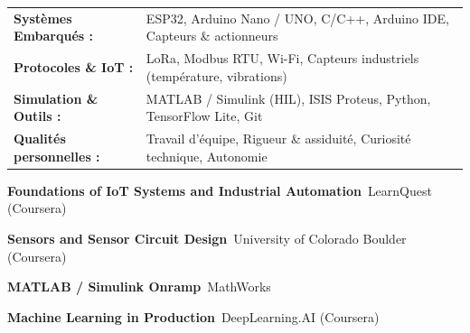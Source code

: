 \documentclass[10pt,a4paper]{../altacv}
\begin{document}
{\small
\begin{tabular}{@{}ll@{}}
\textbf{Systèmes Embarqués :} & ESP32, Arduino Nano / UNO, C/C++, Arduino IDE, Capteurs \& actionneurs \\[1.5pt]
\textbf{Protocoles \& IoT :} & LoRa, Modbus RTU, Wi-Fi, Capteurs industriels (température, vibrations) \\[1.5pt]
\textbf{Simulation \& Outils :} & MATLAB / Simulink (HIL), ISIS Proteus, Python, TensorFlow Lite, Git \\[1.5pt]
\textbf{Qualités personnelles :} & Travail d’équipe, Rigueur \& assiduité, Curiosité technique, Autonomie
\end{tabular}
}

\begin{cvitems}
  \item \textbf{Foundations of IoT Systems and Industrial Automation}~\hfill {\color{emphasis}LearnQuest (Coursera)}
  \item \textbf{Sensors and Sensor Circuit Design}~\hfill {\color{emphasis}University of Colorado Boulder (Coursera)}
  \item \textbf{MATLAB / Simulink Onramp}~\hfill {\color{emphasis}MathWorks}
  \item \textbf{Machine Learning in Production}~\hfill {\color{emphasis}DeepLearning.AI (Coursera)}
\end{cvitems}

\cvactivites
\cvlangues
\end{document}
